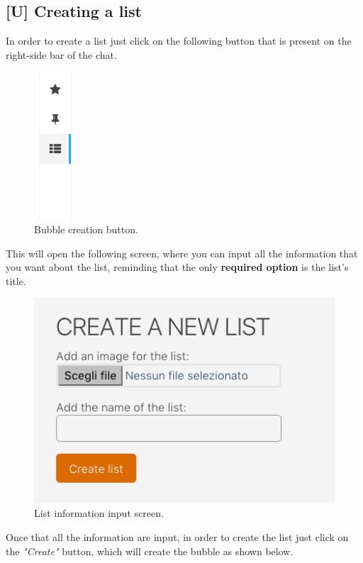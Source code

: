 \newpage
\subsection{[U] Creating a list}
In order to create a list just click on the following button that is present on the right-side bar of the chat.

\begin{figure}[H]
  \centering 
  \includegraphics[scale=1.0]{Sections/3-HowToUse/Images/create_list_button.png}
  \caption{Bubble creation button.}
\end{figure}

This will open the following screen, where you can input all the information that you want about the list, reminding that the only \textbf{required option} is the list's title.

\begin{figure}[H]
  \centering 
  \includegraphics[scale=0.7]{Sections/3-HowToUse/Images/list_create.png}
  \caption{List information input screen.}
\end{figure}

Once that all the information are input, in order to create the list just click on the \textit{"Create"} button, which will create the bubble as shown below.

